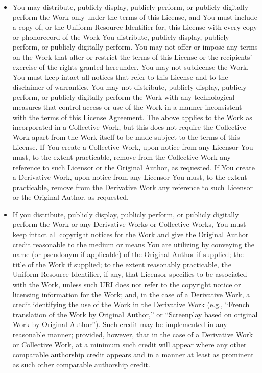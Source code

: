 \documentclass{article}
\begin{document}
\begin{itemize}
\begin{itemize} \item You may distribute, publicly display, publicly
perform, or publicly digitally perform the Work only under the terms
of this License, and You must include a copy of, or the Uniform
Resource Identifier for, this License with every copy or phonorecord
of the Work You distribute, publicly display, publicly perform, or
publicly digitally perform.  You may not offer or impose any terms on
the Work that alter or restrict the terms of this License or the
recipients' exercise of the rights granted hereunder.  You may not
sublicense the Work.  You must keep intact all notices that refer to
this License and to the disclaimer of warranties.  You may not
distribute, publicly display, publicly perform, or publicly digitally
perform the Work with any technological measures that control access
or use of the Work in a manner inconsistent with the terms of this
License Agreement.  The above applies to the Work as incorporated in a
Collective Work, but this does not require the Collective Work apart
from the Work itself to be made subject to the terms of this License. 
If You create a Collective Work, upon notice from any Licensor You
must, to the extent practicable, remove from the Collective Work any
reference to such Licensor or the Original Author, as requested.  If
You create a Derivative Work, upon notice from any Licensor You must,
to the extent practicable, remove from the Derivative Work any
reference to such Licensor or the Original Author, as requested.

\item If you distribute, publicly display, publicly perform, or
publicly digitally perform the Work or any Derivative Works or
Collective Works, You must keep intact all copyright notices for the
Work and give the Original Author credit reasonable to the medium or
means You are utilizing by conveying the name (or pseudonym if
applicable) of the Original Author if supplied; the title of the Work
if supplied; to the extent reasonably practicable, the Uniform
Resource Identifier, if any, that Licensor specifies to be associated
with the Work, unless such URI does not refer to the copyright notice
or licensing information for the Work; and, in the case of a
Derivative Work, a credit identifying the use of the Work in the
Derivative Work (e.g., ``French translation of the Work by Original
Author,'' or ``Screenplay based on original Work by Original
Author'').  Such credit may be implemented in any reasonable manner;
provided, however, that in the case of a Derivative Work or Collective
Work, at a minimum such credit will appear where any other comparable
authorship credit appears and in a manner at least as prominent as
such other comparable authorship credit.


\end{itemize}
\end{itemize}
\end{document}
